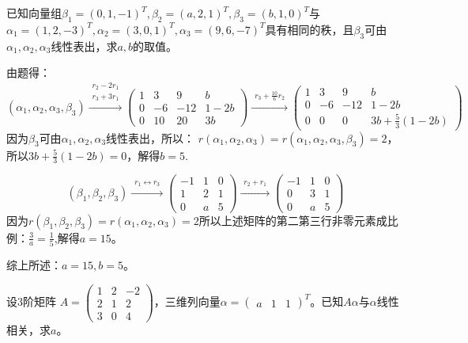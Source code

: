 \documentclass[a4paper]{report}
\begin{document}
\EX 已知向量组$\beta_1=(0,1,-1)^T,\beta_2=(a,2,1)^T,\beta_3=(b,1,0)^T$与
$\alpha_1= (1,2,-3)^T,\alpha_2=(3,0,1)^T,\alpha_3=(9,6,-7)^T$具有相同的秩，且$\beta_3$可由$\alpha_1,\alpha_2,\alpha_3$线性表出，求$a,b$的取值。

\begin{jie}
由题得：
\begin{equation*}
(\alpha_1,\alpha_2,\alpha_3,\beta_3)
\xrightarrow{\substack{r_2- 2r_{1}\\ r_3+3r_1}}
{\begin{pmatrix}
1&3&9&b\\
0&-6&-12&1-2b\\
0&10&20&3b\end{pmatrix}
}\xrightarrow{\substack{ r_3+\frac{10}{6}r_2}}
{\begin{pmatrix}
1&3&9&b\\
0&-6&-12&1-2b\\
0&0&0&3b+\frac{5}{3}(1-2b)\end{pmatrix}
}
\end{equation*}
因为$\beta_3$可由$\alpha_1,\alpha_2,\alpha_3$线性表出，所以：
$r(\alpha_1,\alpha_2,\alpha_3)=r(\alpha_1,\alpha_2,\alpha_3,\beta_3)=2$，所以$3b+\frac{5}{3}(1-2b)=0$，解得$b=5$.

\begin{equation*}
(\beta_1,\beta_2,\beta_3)
\xrightarrow{\substack{r_1\leftrightarrow r_3}}
{
\begin{pmatrix}
-1&1&0\\
1&2&1\\
0&a&5
\end{pmatrix}
}\xrightarrow{\substack{r_2+r_1}}
{
\begin{pmatrix}
-1&1&0\\
0&3&1\\
0&a&5
\end{pmatrix}
}
\end{equation*}
因为$r(\beta_1,\beta_2,\beta_3)=r(\alpha_1,\alpha_2,\alpha_3)=2$所以上述矩阵的第二第三行非零元素成比例：$
\frac{3}{a}=\frac{1}{5}
$,解得$a=15$。

综上所述：$a=15,b=5$。
\end{jie}

\EX 设3阶矩阵
$
A=
\begin{pmatrix}
1&2&-2\\ 2&1&2\\ 3&0&4
\end{pmatrix}
$，三维列向量$\alpha=
\begin{pmatrix}
a&1&1
\end{pmatrix}^T
$。已知$A\alpha$与$\alpha$线性相关，求$a$。
\end{document}
